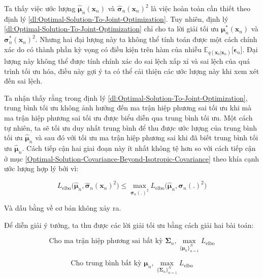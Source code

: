 \documentclass[14pt, a4paper]{article}
\numberwithin{equation}{section}
\numberwithin{figure}{section}
\numberwithin{dl}{section}
\numberwithin{md}{section}
\numberwithin{bd}{section}
\numberwithin{dn}{section}
\numberwithin{hq}{section}
\begin{document}
    Ta thấy việc ước lượng $\hat{\boldsymbol{\mu}}_n (\boldsymbol{x}_n)$ và $\hat{\boldsymbol{\sigma}}_n (\boldsymbol{x}_n)^2$ là việc hoàn toàn cần thiết theo định lý \ref{dl:Optimal-Solution-To-Joint-Optimization}.
    Tuy nhiên, định lý \ref{dl:Optimal-Solution-To-Joint-Optimization} chỉ cho ta lời giải tối ưu $\boldsymbol{\mu}_n^{\ast} (\boldsymbol{x}_n)$ và $\boldsymbol{\sigma}_n^{\ast} (\boldsymbol{x}_n)^2$.
    Nhưng hai đại lượng này ta không thể tính toán được một cách chính xác do có thành phần kỳ vọng có điều kiện trên hàm của nhiễu $\mathbb{E}_{q(\boldsymbol{x}_0 \vert \boldsymbol{x}_n)} \lbrack \boldsymbol{\epsilon}_n \rbrack$.
    Đại lượng này không thể được tính chính xác do sai lệch xấp xỉ và sai lệch của quá trình tối ưu hóa,
    điều này gợi ý ta có thể cải thiện các ước lượng này khi xem xét đến sai lệch.

    Ta nhận thấy rằng trong định lý \ref{dl:Optimal-Solution-To-Joint-Optimization}, trung bình tối ưu không ảnh hưởng đến ma trận hiệp phương sai tối ưu khi mà ma trận hiệp phương sai tối ưu được biểu diễn qua trung bình tối ưu.
    Một cách tự nhiên, ta sẽ tối ưu duy nhất trung bình để thu được ước lượng của trung bình tối ưu $\hat{\boldsymbol{\mu}}_n$ và sau đó với tối ưu ma trận hiệp phương sai khi đã biết trung bình tối ưu $\hat{\boldsymbol{\mu}}_n$.
    Cách tiếp cận hai giai đoạn này ít nhất không tệ hơn so với cách tiếp cận ở mục \ref{Optimal-Solution-Covariance-Beyond-Isotropic-Covariance} theo khía cạnh ước lượng hợp lý bởi vì:

    \begin{equation}
        L_{\mathrm{elbo}}\big( \hat{\boldsymbol{\mu}}_n, \hat{\boldsymbol{\sigma}}_n (\boldsymbol{x}_n)^2 \big) \leq \max_{\boldsymbol{\sigma}_n (.)^2 } L_{\mathrm{elbo}} \big( \hat{\boldsymbol{\mu}}_n, \boldsymbol{\sigma}_n (.)^2 \big)
    \end{equation}

    Và dấu bằng về cơ bản không xảy ra.

    Để diễn giải ý tưởng, ta thu được các lời giải tối ưu bằng cách giải hai bài toán:

    \begin{equation} \label{eq:Arbitrary-Covariance-Optimize-Mean}
        \text{Cho ma trận hiệp phương sai bất kỳ } \boldsymbol{\Sigma}_n, \max_{\lbrace \boldsymbol{\mu}_n \rbrace_{n=1}^N} L_{\mathrm{elbo}}
    \end{equation}

    \begin{equation} \label{eq:Arbitrary-Mean-Optimize-Covariance}
        \text{Cho trung bình bất kỳ } \boldsymbol{\mu}_n, \max_{\lbrace \boldsymbol{\Sigma}_n \rbrace_{n=1}^N} L_{\mathrm{elbo}}
    \end{equation}
\end{document}
